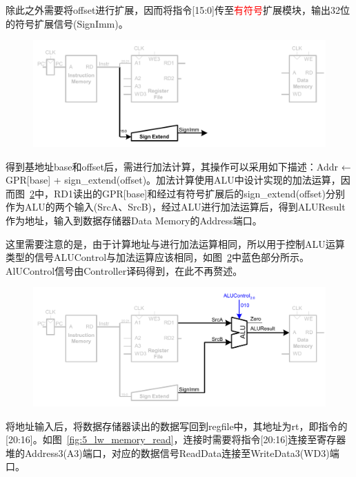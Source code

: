 除此之外需要将offset进行扩展，因而将指令[15:0]传至\textcolor{red}{有符号}扩展模块，输出32位的符号扩展信号(SignImm)。
\begin{figure}[htbp]
	\centering
	\includegraphics[width=1.0\textwidth]{image/3_lw_immediate.pdf}
	\caption{\label{fig:3_lw_immediate}}
\end{figure}

得到基地址base和offset后，需进行加法计算，其操作可以采用如下描述：Addr ← GPR[base] + sign\_extend(offset)。加法计算使用ALU中设计实现的加法运算，因而图~\ref{fig:4_lw_address}中，RD1读出的GPR[base]和经过有符号扩展后的sign\_extend(offset)分别作为ALU的两个输入(SrcA、SrcB)，经过ALU进行加法运算后，得到ALUResult作为地址，输入到数据存储器Data Memory的Address端口。

这里需要注意的是，由于计算地址与进行加法运算相同，所以用于控制ALU运算类型的信号ALUControl与加法运算应该相同，如图~\ref{fig:4_lw_address}中蓝色部分所示。AlUControl信号由Controller译码得到，在此不再赘述。
\begin{figure}[htbp]
	\centering
	\includegraphics[width=1.0\textwidth]{image/4_lw_address.pdf}
	\caption{\label{fig:4_lw_address}}
\end{figure}

\newpage
将地址输入后，将数据存储器读出的数据写回到regfile中，其地址为rt，即指令的[20:16]。如图~\ref{fig:5_lw_memory_read}，连接时需要将指令[20:16]连接至寄存器堆的Address3(A3)端口，对应的数据信号ReadData连接至WriteData3(WD3)端口。

